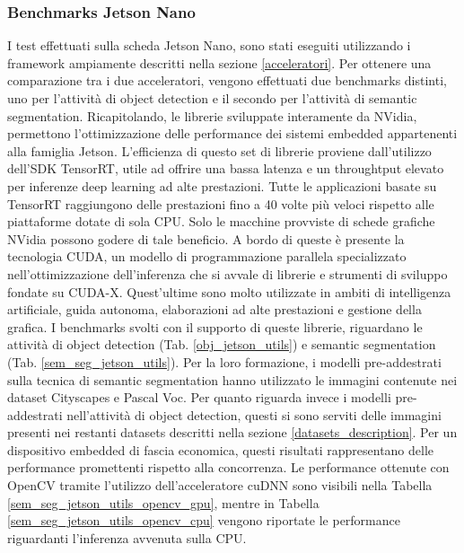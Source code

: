 \subsubsection{Benchmarks Jetson Nano}
I test effettuati sulla scheda Jetson Nano, sono stati eseguiti utilizzando i framework ampiamente descritti nella sezione \ref{acceleratori}.
Per ottenere una comparazione tra i due acceleratori, vengono effettuati due benchmarks distinti, uno per l'attività di object detection e il secondo per l'attività di semantic segmentation.
Ricapitolando, le librerie sviluppate interamente da NVidia, permettono l'ottimizzazione delle performance dei sistemi embedded appartenenti alla famiglia Jetson. L'efficienza di questo set di librerie proviene dall'utilizzo dell'SDK TensorRT, utile ad offrire una bassa latenza e un throughtput elevato per inferenze deep learning ad alte prestazioni. Tutte le applicazioni basate su TensorRT raggiungono delle prestazioni fino a 40 volte più veloci rispetto alle piattaforme dotate di sola CPU. Solo le macchine provviste di schede grafiche NVidia possono godere di tale beneficio. A bordo di queste è presente la tecnologia CUDA, un modello di programmazione parallela specializzato nell'ottimizzazione dell'inferenza che si avvale di librerie e strumenti di sviluppo fondate su CUDA-X. Quest'ultime sono molto utilizzate  in ambiti di intelligenza artificiale, guida autonoma, elaborazioni ad alte prestazioni e gestione della grafica. 
I benchmarks svolti con il supporto di queste librerie, riguardano le attività di object detection (Tab. \ref{obj_jetson_utils}) e semantic segmentation (Tab. \ref{sem_seg_jetson_utils}).
Per la loro formazione, i modelli pre-addestrati sulla tecnica di semantic segmentation hanno utilizzato le immagini contenute nei dataset Cityscapes e Pascal Voc. Per quanto riguarda invece i modelli pre-addestrati nell'attività di object detection, questi si sono serviti delle immagini presenti nei restanti datasets descritti nella sezione \ref{datasets_description}.
Per un dispositivo embedded di fascia economica, questi risultati rappresentano delle performance promettenti rispetto alla concorrenza.
Le performance ottenute con OpenCV tramite l'utilizzo dell'acceleratore cuDNN sono visibili nella Tabella \ref{sem_seg_jetson_utils_opencv_gpu}, mentre in Tabella \ref{sem_seg_jetson_utils_opencv_cpu} vengono riportate le performance riguardanti l'inferenza avvenuta sulla CPU.

